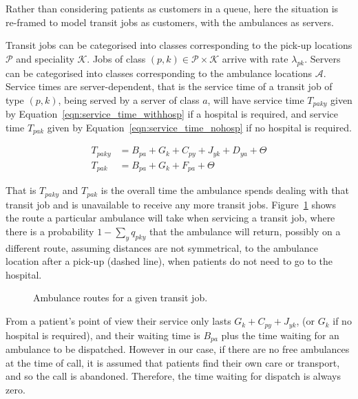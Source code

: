 \documentclass[preprint,12pt]{elsarticle}
\begin{document}
Rather than considering patients as customers in a queue, here the situation
is re-framed to model transit jobs as customers, with the ambulances as
servers.

Transit jobs can be categorised into classes corresponding to the pick-up
locations $\mathcal{P}$ and speciality $\mathcal{K}$. Jobs of class
$(p, k) \in \mathcal{P} \times \mathcal{K}$ arrive with rate $\lambda_{pk}$.
Servers can be categorised into classes corresponding to the ambulance
locations $\mathcal{A}$. Service times are server-dependent, that is the
service time of a transit job of type $(p, k)$, being served by a server of
class $a$, will have service time $T_{paky}$ given by
Equation~\ref{eqn:service_time_withhosp} if a hospital is required, and
service time $T_{pak}$ given by Equation~\ref{eqn:service_time_nohosp} if no
hospital is required.

\begin{align}
T_{paky} &= B_{pa} + G_k + C_{py} + J_{yk} + D_{ya} + \Theta \label{eqn:service_time_withhosp} \\
T_{pak} &= B_{pa} + G_k + F_{pa} + \Theta \label{eqn:service_time_nohosp}
\end{align}

That is $T_{paky}$ and $T_{pak}$ is the overall time the ambulance spends
dealing with that transit job and is unavailable to receive any more transit
jobs. Figure~\ref{fig:travel_routes} shows the route a particular ambulance
will take when servicing a transit job, where there is a probability
$1 - \sum_{y} q_{pky}$ that the ambulance will return, possibly on a different
route, assuming distances are not symmetrical, to the ambulance location after
a pick-up (dashed line), when patients do not need to go to the hospital.

\begin{figure}
    \centering
    
    \caption{Ambulance routes for a given transit job.}
    \label{fig:travel_routes}
\end{figure}

From a patient's point of view their service only lasts $G_k + C_{py} + J_{yk}$,
(or $G_k$ if no hospital is required), and their waiting time is $B_{pa}$ plus
the time waiting for an ambulance to be dispatched. However in our case, if
there are no free ambulances at the time of call, it is assumed that patients
find their own care or transport, and so the call is abandoned. Therefore, the
time waiting for dispatch is always zero.
\end{document}
